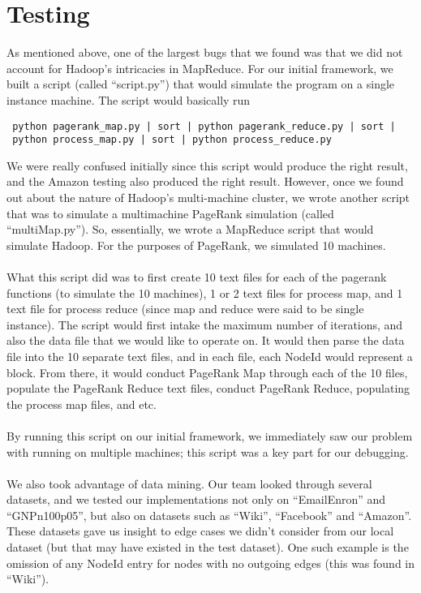 \section{Testing}
 As mentioned above, one of the largest bugs that we found was that we did not account for Hadoop's intricacies in MapReduce. For our initial framework, we built a script (called ``script.py'') that would simulate the program on a single instance machine. The script would basically run
 \begin{verbatim}
 python pagerank_map.py | sort | python pagerank_reduce.py | sort | 
 python process_map.py | sort | python process_reduce.py
 \end{verbatim}
 We were really confused initially since this script would produce the right result, and the Amazon testing also produced the right result. However, once we found out about the nature of Hadoop's multi-machine cluster, we wrote another script that was to simulate a multimachine PageRank simulation (called ``multiMap.py''). So, essentially, we wrote a MapReduce script that would simulate Hadoop. For the purposes of PageRank, we simulated 10 machines.
 \\ \\
 What this script did was to first create 10 text files for each of the pagerank functions (to simulate the 10 machines), 1 or 2 text files for process map, and 1 text file for process reduce (since map and reduce were said to be single instance). The script would first intake the maximum number of iterations, and also the data file that we would like to operate on. It would then parse the data file into the 10 separate text files, and in each file, each NodeId would represent a block. From there, it would conduct PageRank Map through each of the 10 files, populate the PageRank Reduce text files, conduct PageRank Reduce, populating the process map files, and etc.
 \\ \\
 By running this script on our initial framework, we immediately saw our problem with running on multiple machines; this script was a key part for our debugging.
 \\ \\
 We also took advantage of data mining. Our team looked through several datasets, and we tested our implementations not only on ``EmailEnron'' and ``GNPn100p05'', but also on datasets such as ``Wiki'', ``Facebook'' and ``Amazon''. These datasets gave us insight to edge cases we didn't consider from our local dataset (but that may have existed in the test dataset). One such example is the omission of any NodeId entry for nodes with no outgoing edges (this was found in ``Wiki'').

